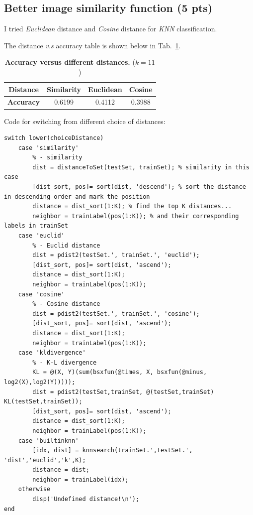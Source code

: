 \documentclass[12pt]{article}
\newcounter{list}
\begin{document}
\subsection{Better image similarity function (5 pts)}
I tried \emph{Euclidean} distance and \emph{Cosine} distance for \emph{KNN} classification. 

The distance \emph{v.s} accuracy table is shown below in Tab.~\ref{tab:acc_vs_diff_dis}.

\begin{table}[h!]
  \centering

  \begin{tabular}{|c|c|c|c|}
    \hline
    {\bf Distance} & {\bf Similarity} & {\bf Euclidean} & {\bf Cosine}  \\
    \hline
    {\bf Accuracy} & 0.6199 & 0.4112 & 0.3988 \\
    \hline
  \end{tabular}
  \caption{{\bf Accuracy versus different distances.} ($k=11$)}
\label{tab:acc_vs_diff_dis}
\end{table}

Code for switching from different choice of distances:

\begin{lstlisting}
switch lower(choiceDistance)
    case 'similarity'
        % - similarity
        dist = distanceToSet(testSet, trainSet); % similarity in this case
        [dist_sort, pos]= sort(dist, 'descend'); % sort the distance in descending order and mark the position
        distance = dist_sort(1:K); % find the top K distances...
        neighbor = trainLabel(pos(1:K)); % and their corresponding labels in trainSet
    case 'euclid'
        % - Euclid distance
        dist = pdist2(testSet.', trainSet.', 'euclid');
        [dist_sort, pos]= sort(dist, 'ascend');
        distance = dist_sort(1:K);
        neighbor = trainLabel(pos(1:K));
    case 'cosine'
        % - Cosine distance
        dist = pdist2(testSet.', trainSet.', 'cosine');
        [dist_sort, pos]= sort(dist, 'ascend');
        distance = dist_sort(1:K);
        neighbor = trainLabel(pos(1:K));
    case 'kldivergence'
        % - K-L divergence
        KL = @(X, Y)(sum(bsxfun(@times, X, bsxfun(@minus, log2(X),log2(Y)))));
        dist = pdist2(testSet,trainSet, @(testSet,trainSet) KL(testSet,trainSet));
        [dist_sort, pos]= sort(dist, 'ascend');
        distance = dist_sort(1:K);
        neighbor = trainLabel(pos(1:K));
    case 'builtinknn'
        [idx, dist] = knnsearch(trainSet.',testSet.', 'dist','euclid','k',K);
        distance = dist;
        neighbor = trainLabel(idx);
    otherwise
        disp('Undefined distance!\n');
end
\end{lstlisting}
\end{document}
